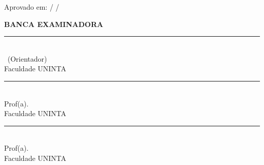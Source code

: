 \begin{titlepage}
  \begin{center}

    \textbf{\large\MakeUppercase{\oautor}}

    \vspace{0.8cm}

    \textbf{\Large\MakeUppercase{\otitulo}}

    \vspace{0.8cm}

    \small\opreambulo

    \vspace{0.8cm}

    Aprovado em: \underline{\hspace{2cm}} /
                 \underline{\hspace{2cm}} /
                 \underline{\hspace{2cm}}

  \end{center}

  \vspace{1cm}
  \noindent\textbf{BANCA EXAMINADORA}
  \vspace{1.5cm}

  \begin{center}

    \rule{10cm}{0.4pt}\\
    \oorientador\ (Orientador)\\
    Faculdade UNINTA

    \vspace{1.5cm}

    \rule{10cm}{0.4pt}\\
    Prof(a). \underline{\hspace{6cm}}\\
    Faculdade UNINTA

    \vspace{1.5cm}

    \rule{10cm}{0.4pt}\\
    Prof(a). \underline{\hspace{6cm}}\\
    Faculdade UNINTA

  \end{center}
\end{titlepage}
\cleardoublepage
